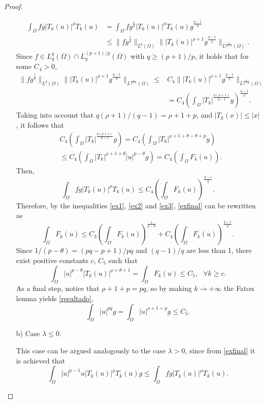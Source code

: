 \documentclass[preprint,12pt]{elsarticle}
\begin{document}
\begin{proof}
\begin{enumerate}
				\begin{align*}
					\int_{\Omega}fg|T_k(u)|^{\rho}T_k(u)&=\int_{\Omega}fg^{\frac{1}{q}}|T_k(u)|^{\rho}T_k(u)g^{\frac{q-1}{q}}
					\\&\leq\|fg^{\frac{1}{q}}\|_{L^q(\Omega)}\||T_k(u)|^{\rho+1}g^{\frac{q-1}{q}}\|_{L^{\frac{q}{q-1}}(\Omega)}.
				\end{align*}
				Since $f\in L^q_g(\Omega)\cap L^{(p+1)/p}_g(\Omega)$ with $q\geq (p+1)/p$, it holds that for some $C_4>0$,
				\begin{align*}
					\|fg^{\frac{1}{q}}\|_{L^q(\Omega)}\||T_k(u)|^{\rho+1}g^{\frac{q-1}{q}}\|_{L^{\frac{q}{q-1}}(\Omega)}  \leq& C_4\||T_k(u)|^{\rho+1}g^{\frac{q-1}{q}}\|_{L^{\frac{q}{q-1}}(\Omega)}\\
					& = C_4 \left( \int_{\Omega} |T_k|^{\frac{q(\rho+1)}{q-1}}g\right)^{\frac{q-1}{q}}.
				\end{align*}
				Taking into account that $q(\rho+1)/(q-1)=\rho +1+p$, and $|T_k(x)|\leq |x|$,  it follows that
				\begin{align*}
					&C_4 \left( \int_{\Omega} |T_k|^{\frac{q(\rho+1)}{q-1}} g\right) = C_4 \left( \int_{\Omega} |T_k|^{\rho +1+\theta-\theta + p} g\right)
					\\ &\leq C_4 \left( \int_{\Omega} |T_k|^{\rho +1+\theta}|u|^{p-\theta} g\right)= C_4 \left( \int_{\Omega} F_k(u)\right). 
				\end{align*}
				Then, 
				\begin{equation}\label{ex3}
					\int_{\Omega}fg|T_k(u)|^{\rho}T_k(u)\leq C_4\left( \int_{\Omega} F_k(u)\right)^{\frac{q-1}{q}}.
				\end{equation}
				Therefore, by the inequalities \eqref{ex1}, \eqref{ex2} and \eqref{ex3}, \eqref{exfinal} can be rewritten as 
				\[\int_{\Omega}F_k(u)\leq  C_3 \left(\int_{\Omega}F_k(u)\right)^{\frac{1}{p -\theta}}+C_4\left(\int_{\Omega}F_k(u)\right)^{\frac{q-1}{q}}.\]		
				Since $1/(p -\theta)= (pq-p+1)/pq$ and $(q-1)/q$ are less than 1, there exist positive constants $c$, $C_5$ such that 
				\[\int_{\Omega}|u|^{p -\theta}|T_k(u)|^{\rho+\theta+1}=\int_{\Omega}F_k(u)\leq C_5, \text{ $\forall k\geq c$}.\]
				As a final step, notice that $\rho+1+p =p q$, so by making $k\rightarrow +\infty$ the Fatou lemma yields \eqref{resultado},
				\[\int_{\Omega}|u|^{p q}g=\int_{\Omega}|u|^{\rho+1+p }g\leq C_5.\]
				\item[b)] Case $\lambda\leq 0$.\par 
				This case can be argued analogously to the case $\lambda >0$, since from \eqref{exfinal} it is achieved that
				\[\int_{\Omega}|u|^{p -1}u|T_k(u)|^{\rho}T_k(u)g\leq \int_{\Omega}fg|T_k(u)|^{\rho}T_k(u).\] 
			\end{enumerate}
		\end{proof}
\end{document}
